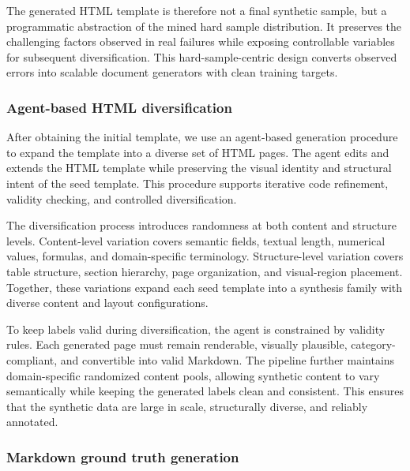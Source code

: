 The generated HTML template is therefore not a final synthetic sample, but a programmatic abstraction of the mined hard sample distribution. It preserves the challenging factors observed in real failures while exposing controllable variables for subsequent diversification. This hard-sample-centric design converts observed errors into scalable document generators with clean training targets.

\subsubsection{Agent-based HTML diversification}

After obtaining the initial template, we use an agent-based generation procedure to expand the template into a diverse set of HTML pages. The agent edits and extends the HTML template while preserving the visual identity and structural intent of the seed template. This procedure supports iterative code refinement, validity checking, and controlled diversification.

The diversification process introduces randomness at both content and structure levels. Content-level variation covers semantic fields, textual length, numerical values, formulas, and domain-specific terminology. Structure-level variation covers table structure, section hierarchy, page organization, and visual-region placement. Together, these variations expand each seed template into a synthesis family with diverse content and layout configurations.

To keep labels valid during diversification, the agent is constrained by validity rules. Each generated page must remain renderable, visually plausible, category-compliant, and convertible into valid Markdown. The pipeline further maintains domain-specific randomized content pools, allowing synthetic content to vary semantically while keeping the generated labels clean and consistent. This ensures that the synthetic data are large in scale, structurally diverse, and reliably annotated.

\subsubsection{Markdown ground truth generation}

